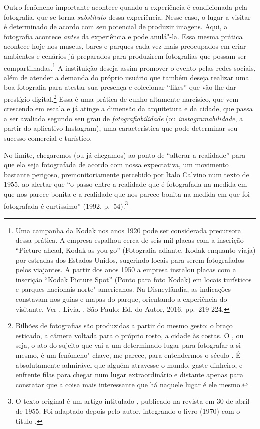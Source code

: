 Outro fenômeno importante acontece quando a experiência é condicionada
pela fotografia, que se torna \emph{substituto} dessa experiência. Nesse
caso, o lugar a visitar é determinado de acordo com seu potencial de
produzir imagens. Aqui, a fotografia acontece \emph{antes} da
experiência e pode anulá"-la. Essa mesma prática acontece hoje nos
museus, bares e parques cada vez mais preocupados em criar ambientes e
cenários já preparados para produzirem fotografias que possam ser
compartilhadas.\footnote{Uma campanha da Kodak nos anos 1920 pode ser
  considerada precursora dessa prática. A empresa espalhou cerca de seis
  mil placas com a inscrição ``Picture ahead, Kodak as you
  go'' (Fotografia adiante, Kodak enquanto viaja) por estradas dos
  Estados Unidos, sugerindo locais para serem fotografados pelos
  viajantes. A partir dos anos 1950 a empresa instalou placas com a
  inscrição ``Kodak Picture Spot'' (Ponto para foto Kodak) em locais
  turísticos e parques nacionais norte"-americanos. Na Disneylândia, as
  indicações constavam nos guias e mapas do parque, orientando a
  experiência do visitante. Ver , Lívia. {}. São Paulo: Ed. do Autor,
  2016, pp.~219-224.} A instituição deseja assim promover o evento pelas
redes sociais, além de atender a demanda do próprio usuário que também
deseja realizar uma boa fotografia para atestar sua presença e
colecionar ``likes'' que vão lhe dar prestígio digital.\footnote{Bilhões de fotografias são produzidas a partir do mesmo gesto: o braço esticado, a câmera voltada para o próprio rosto, a cidade às costas. O {}, ou seja, o ato do sujeito que vai a um determinado lugar para fotografar a si mesmo, é um fenômeno"-chave, me parece, para entendermos o século . É absolutamente admirável que alguém atravesse o mundo, gaste dinheiro, e enfrente filas para chegar num lugar extraordinário e distante apenas para constatar que a coisa mais interessante que há naquele lugar é ele mesmo.}
Essa é uma prática de cunho altamente narcísico, que vem crescendo em escala e já atinge a dimensão da arquitetura e da cidade, que passa a ser avaliada segundo seu grau de \emph{fotografiabilidade} (ou \emph{instagramabilidade},
a partir do aplicativo Instagram), uma
característica que pode determinar seu sucesso comercial e turístico.

No limite, chegaremos (ou já chegamos) ao ponto de ``alterar a
realidade'' para que ela seja fotografada de acordo com nossa
expectativa, um movimento bastante perigoso, premonitoriamente percebido
por Italo Calvino num texto de 1955, ao alertar que ``o passo entre a
realidade que é fotografada na medida em que nos parece bonita e a
realidade que nos parece bonita na medida em que foi fotografada é
curtíssimo'' (1992, p.~54).\footnote{O texto original é um artigo
  intitulado {}, publicado na revista {} em 30 de abril de 1955. Foi adaptado depois pelo autor,
  integrando o livro {} (1970) com o título {}.}


